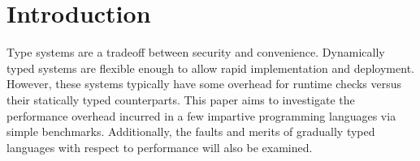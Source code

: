 \section{Introduction}
Type systems are a tradeoff between security and convenience. Dynamically typed systems are flexible enough to allow rapid implementation and deployment. However, these systems typically have some overhead for runtime checks versus their statically typed counterparts. This paper aims to investigate the  performance overhead incurred in a few impartive programming languages via simple benchmarks. Additionally, the faults and merits of gradually typed languages with respect to performance will also be examined.
